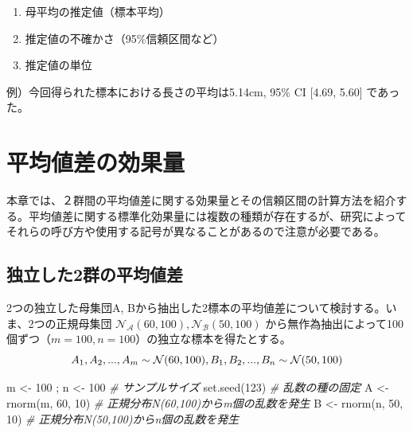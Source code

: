 \documentclass[
  ja=standard, xelatex, base=12pt]{bxjsreport}
\newenvironment{Shaded}{\begin{snugshade}}{\end{snugshade}}
\newcommand{\CommentTok}[1]{\textcolor[rgb]{0.56,0.35,0.01}{\textit{#1}}}
\newcommand{\DecValTok}[1]{\textcolor[rgb]{0.00,0.00,0.81}{#1}}
\newcommand{\FunctionTok}[1]{\textcolor[rgb]{0.00,0.00,0.00}{#1}}
\newcommand{\NormalTok}[1]{#1}
\newcommand{\OtherTok}[1]{\textcolor[rgb]{0.56,0.35,0.01}{#1}}
\begin{document}
\begin{enumerate}
\def\labelenumi{\arabic{enumi}.}
\item
  母平均の推定値（標本平均）
\item
  推定値の不確かさ（95\%信頼区間など）
\item
  推定値の単位
\end{enumerate}

例）今回得られた標本における長さの平均は5.14cm, 95\% CI {[}4.69, 5.60{]} であった。

\hypertarget{ux5e73ux5747ux5024ux5deeux306eux52b9ux679cux91cf}{%
\chapter{平均値差の効果量}\label{ux5e73ux5747ux5024ux5deeux306eux52b9ux679cux91cf}}

本章では、２群間の平均値差に関する効果量とその信頼区間の計算方法を紹介する。平均値差に関する標準化効果量には複数の種類が存在するが、研究によってそれらの呼び方や使用する記号が異なることがあるので注意が必要である。

\hypertarget{ux72ecux7acbux3057ux305f2ux7fa4ux306eux5e73ux5747ux5024ux5dee}{%
\section{独立した2群の平均値差}\label{ux72ecux7acbux3057ux305f2ux7fa4ux306eux5e73ux5747ux5024ux5dee}}

2つの独立した母集団A, Bから抽出した2標本の平均値差について検討する。いま、2つの正規母集団 \(\mathcal{N_A}(60, 100), \mathcal{N_B}(50, 100)\) から無作為抽出によって100個ずつ（\(m=100, n=100\)）の独立な標本を得たとする。\[
A_1, A_2, ..., A_{m} \sim \mathcal{N}(60, 100),\\
B_1, B_2, ..., B_{n} \sim \mathcal{N}(50, 100)
\]

\begin{Shaded}
\begin{Highlighting}[]
\NormalTok{m }\OtherTok{\textless{}{-}} \DecValTok{100}\NormalTok{ ; n }\OtherTok{\textless{}{-}} \DecValTok{100}   \CommentTok{\# サンプルサイズ}
\FunctionTok{set.seed}\NormalTok{(}\DecValTok{123}\NormalTok{)         }\CommentTok{\# 乱数の種の固定}
\NormalTok{A }\OtherTok{\textless{}{-}} \FunctionTok{rnorm}\NormalTok{(m, }\DecValTok{60}\NormalTok{, }\DecValTok{10}\NormalTok{) }\CommentTok{\# 正規分布N(60,100)からm個の乱数を発生}
\NormalTok{B }\OtherTok{\textless{}{-}} \FunctionTok{rnorm}\NormalTok{(n, }\DecValTok{50}\NormalTok{, }\DecValTok{10}\NormalTok{) }\CommentTok{\# 正規分布N(50,100)からn個の乱数を発生}
\end{Highlighting}
\end{Shaded}
\end{document}
